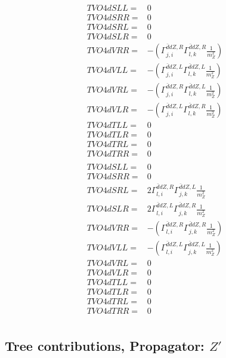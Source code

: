\documentclass[A4,landscape]{article}
\begin{document}
\begin{align} 
  TVO4dSLL= & 0 \\ 
  TVO4dSRR= & 0 \\ 
  TVO4dSRL= & 0 \\ 
  TVO4dSLR= & 0 \\ 
  TVO4dVRR= & -(\Gamma^{\bar{d}d Z ,R}_{j, i} \Gamma^{\bar{d}d Z ,R}_{l, k} \frac{1}{m^2_{Z}}) \\ 
  TVO4dVLL= & -(\Gamma^{\bar{d}d Z ,L}_{j, i} \Gamma^{\bar{d}d Z ,L}_{l, k} \frac{1}{m^2_{Z}}) \\ 
  TVO4dVRL= & -(\Gamma^{\bar{d}d Z ,R}_{j, i} \Gamma^{\bar{d}d Z ,L}_{l, k} \frac{1}{m^2_{Z}}) \\ 
  TVO4dVLR= & -(\Gamma^{\bar{d}d Z ,L}_{j, i} \Gamma^{\bar{d}d Z ,R}_{l, k} \frac{1}{m^2_{Z}}) \\ 
  TVO4dTLL= & 0 \\ 
  TVO4dTLR= & 0 \\ 
  TVO4dTRL= & 0 \\ 
  TVO4dTRR= & 0 \\ 
\end{align} 
\begin{align} 
  TVO4dSLL= & 0 \\ 
  TVO4dSRR= & 0 \\ 
  TVO4dSRL= & 2 \Gamma^{\bar{d}d Z ,R}_{l, i} \Gamma^{\bar{d}d Z ,L}_{j, k} \frac{1}{m^2_{Z}} \\ 
  TVO4dSLR= & 2 \Gamma^{\bar{d}d Z ,L}_{l, i} \Gamma^{\bar{d}d Z ,R}_{j, k} \frac{1}{m^2_{Z}} \\ 
  TVO4dVRR= & -(\Gamma^{\bar{d}d Z ,R}_{l, i} \Gamma^{\bar{d}d Z ,R}_{j, k} \frac{1}{m^2_{Z}}) \\ 
  TVO4dVLL= & -(\Gamma^{\bar{d}d Z ,L}_{l, i} \Gamma^{\bar{d}d Z ,L}_{j, k} \frac{1}{m^2_{Z}}) \\ 
  TVO4dVRL= & 0 \\ 
  TVO4dVLR= & 0 \\ 
  TVO4dTLL= & 0 \\ 
  TVO4dTLR= & 0 \\ 
  TVO4dTRL= & 0 \\ 
  TVO4dTRR= & 0 \\ 
\end{align} 
\subsection{Tree contributions, Propagator: ${Z'}$} 
\end{document}
